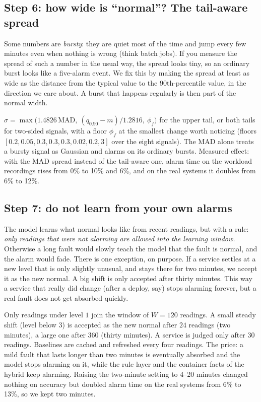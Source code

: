 \subsection{Step 6: how wide is ``normal''? The tail-aware spread}
\begin{simplebox}
Some numbers are \emph{bursty}: they are quiet most of the time and jump every few minutes even when nothing is wrong (think batch jobs). If you measure the spread of such a number in the usual way, the spread looks tiny, so an ordinary burst looks like a five-alarm event. We fix this by making the spread at least as wide as the distance from the typical value to the 90th-percentile value, in the direction we care about. A burst that happens regularly is then part of the normal width.
\end{simplebox}

\begin{techbox}
$\sigma=\max\bigl(1.4826\,\mathrm{MAD},\ (q_{0.90}-m)/1.2816,\ \phi_f\bigr)$ for the upper tail, or both tails for two-sided signals, with a floor $\phi_f$ at the smallest change worth noticing (floors $[0.2,0.05,0.3,0.3,0.3,0.02,0.2,3]$ over the eight signals). The MAD alone treats a bursty signal as Gaussian and alarms on its ordinary bursts. Measured effect: with the MAD spread instead of the tail-aware one, alarm time on the workload recordings rises from 0\% to 10\% and 6\%, and on the real systems it doubles from 6\% to 12\%.
\end{techbox}

\subsection{Step 7: do not learn from your own alarms}
\begin{simplebox}
The model learns what normal looks like from recent readings, but with a rule: \emph{only readings that were not alarming are allowed into the learning window.} Otherwise a long fault would slowly teach the model that the fault is normal, and the alarm would fade. There is one exception, on purpose. If a service settles at a new level that is only slightly unusual, and stays there for two minutes, we accept it as the new normal. A big shift is only accepted after thirty minutes. This way a service that really did change (after a deploy, say) stops alarming forever, but a real fault does not get absorbed quickly.
\end{simplebox}

\begin{techbox}
Only readings under level $1$ join the window of $W=120$ readings. A small steady shift (level below $3$) is accepted as the new normal after $24$ readings (two minutes), a large one after $360$ (thirty minutes). A service is judged only after $30$ readings. Baselines are cached and refreshed every four readings. The price: a mild fault that lasts longer than two minutes is eventually absorbed and the model stops alarming on it, while the rule layer and the container facts of the hybrid keep alarming. Raising the two-minute setting to 4--20 minutes changed nothing on accuracy but doubled alarm time on the real systems from 6\% to 13\%, so we kept two minutes.
\end{techbox}

